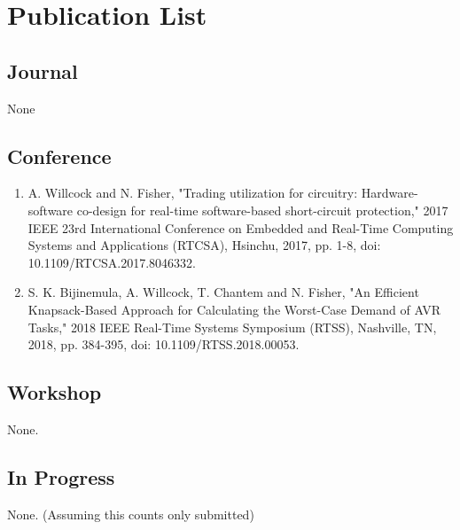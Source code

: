 \section{Publication List}   \label{chap:publicationList}

\subsection{Journal}

None

\subsection{Conference}

\begin{enumerate}
    \item A. Willcock and N. Fisher, "Trading utilization for circuitry: Hardware-software co-design for real-time software-based short-circuit protection," 2017 IEEE 23rd International Conference on Embedded and Real-Time Computing Systems and Applications (RTCSA), Hsinchu, 2017, pp. 1-8, doi: 10.1109/RTCSA.2017.8046332. \cite{willcock_trading_2017}
    \item S. K. Bijinemula, A. Willcock, T. Chantem and N. Fisher, "An Efficient Knapsack-Based Approach for Calculating the Worst-Case Demand of AVR Tasks," 2018 IEEE Real-Time Systems Symposium (RTSS), Nashville, TN, 2018, pp. 384-395, doi: 10.1109/RTSS.2018.00053. \cite{bijinemula_efficient_2019}
\end{enumerate}

\subsection{Workshop}

None.

\subsection{In Progress}

None. (Assuming this counts only submitted)